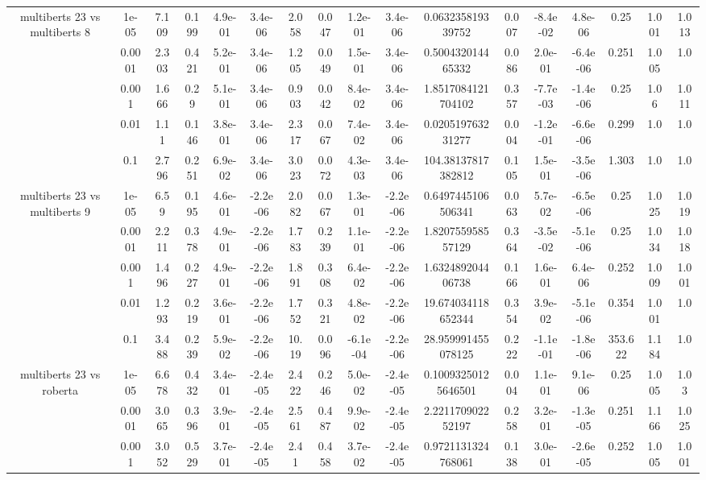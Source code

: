 \begin{tabular}{|c|c|c|c|c|c|c|c|c|c|c|c|c|c|c|c|c|}
\hline
\multirow{5}{*}{multiberts 23 vs multiberts 8} & 1e-05 & 7.109 & 0.199 & 4.9e-01 & 3.4e-06 & 2.058 & 0.047 & 1.2e-01 & 3.4e-06 & 0.063235819339752 & 0.007 & -8.4e-02 & 4.8e-06 & 0.25 & 1.001 & 1.013 \\
 & 0.0001 & 2.303 & 0.421 & 5.2e-01 & 3.4e-06 & 1.205 & 0.049 & 1.5e-01 & 3.4e-06 & 0.500432014465332 & 0.086 & 2.0e-01 & -6.4e-06 & 0.251 & 1.005 & 1.0 \\
 & 0.001 & 1.666 & 0.29 & 5.1e-01 & 3.4e-06 & 0.903 & 0.042 & 8.4e-02 & 3.4e-06 & 1.8517084121704102 & 0.357 & -7.7e-03 & -1.4e-06 & 0.25 & 1.06 & 1.011 \\
 & 0.01 & 1.11 & 0.146 & 3.8e-01 & 3.4e-06 & 2.317 & 0.067 & 7.4e-02 & 3.4e-06 & 0.020519763231277 & 0.004 & -1.2e-01 & -6.6e-06 & 0.299 & 1.0 & 1.0 \\
 & 0.1 & 2.796 & 0.251 & 6.9e-02 & 3.4e-06 & 3.023 & 0.072 & 4.3e-03 & 3.4e-06 & 104.38137817382812 & 0.105 & 1.5e-01 & -3.5e-06 & 1.303 & 1.0 & 1.0 \\
\hline
\multirow{5}{*}{multiberts 23 vs multiberts 9} & 1e-05 & 6.59 & 0.195 & 4.6e-01 & -2.2e-06 & 2.082 & 0.067 & 1.3e-01 & -2.2e-06 & 0.6497445106506341 & 0.063 & 5.7e-02 & -6.5e-06 & 0.25 & 1.025 & 1.019 \\
 & 0.0001 & 2.211 & 0.378 & 4.9e-01 & -2.2e-06 & 1.783 & 0.239 & 1.1e-01 & -2.2e-06 & 1.820755958557129 & 0.364 & -3.5e-02 & -5.1e-06 & 0.25 & 1.034 & 1.018 \\
 & 0.001 & 1.496 & 0.227 & 4.9e-01 & -2.2e-06 & 1.891 & 0.308 & 6.4e-02 & -2.2e-06 & 1.632489204406738 & 0.166 & 1.6e-01 & 6.4e-06 & 0.252 & 1.009 & 1.001 \\
 & 0.01 & 1.293 & 0.219 & 3.6e-01 & -2.2e-06 & 1.752 & 0.321 & 4.8e-02 & -2.2e-06 & 19.674034118652344 & 0.354 & 3.9e-02 & -5.1e-06 & 0.354 & 1.001 & 1.0 \\
 & 0.1 & 3.488 & 0.239 & 5.9e-02 & -2.2e-06 & 10.19 & 0.096 & -6.1e-04 & -2.2e-06 & 28.959991455078125 & 0.222 & -1.1e-01 & -1.8e-06 & 353.622 & 1.184 & 1.0 \\
\hline
\multirow{5}{*}{multiberts 23 vs roberta } & 1e-05 & 6.678 & 0.432 & 3.4e-01 & -2.4e-05 & 2.422 & 0.246 & 5.0e-02 & -2.4e-05 & 0.10093250125646501 & 0.004 & 1.1e-01 & 9.1e-06 & 0.25 & 1.005 & 1.03 \\
 & 0.0001 & 3.065 & 0.396 & 3.9e-01 & -2.4e-05 & 2.561 & 0.487 & 9.9e-02 & -2.4e-05 & 2.221170902252197 & 0.258 & 3.2e-01 & -1.3e-05 & 0.251 & 1.166 & 1.025 \\
 & 0.001 & 3.052 & 0.529 & 3.7e-01 & -2.4e-05 & 2.41 & 0.458 & 3.7e-02 & -2.4e-05 & 0.9721131324768061 & 0.138 & 3.0e-01 & -2.6e-05 & 0.252 & 1.005 & 1.001 \\

\end{tabular}

